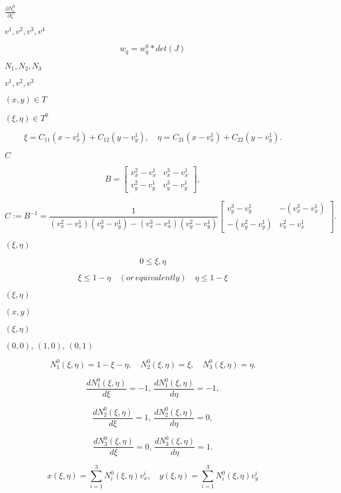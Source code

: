 \documentclass{article}
\begin{document}
$ \frac{\partial N^0_i} {\partial \zeta }
$
\pagebreak

$ v^1, v^2, v^3, v^4
$
\pagebreak

\[ w_q = w^0_q * det(J) \]
\pagebreak

$ N_1, N_2, N_3$
\pagebreak

$ v^1, v^2, v^3$
\pagebreak

$ (x,y) \in T $
\pagebreak

$ (\xi, \eta) \in T^0 $
\pagebreak

\[ \xi = C_{11} (x - v^1_x) + C_{12} (y - v^1_y), \quad \eta = C_{21} (x -
v^1_x) + C_{22} (y - v^1_y). \]
\pagebreak

$ C$
\pagebreak

\[ B = \left[ {\begin{array}{cc} v^2_x - v^1_x & v^3_x - v^1_x \\
v^2_y - v^1_y & v^3_y - v^1_y \end{array}}\right], \]
\pagebreak

\[ C := B^{-1} = \frac{1}{(v^2_x - v^1_x)(v^3_y - v^1_y) - (v^3_x - v^1_x)
(v^2_y - v^1_y)} \left[ {\begin{array}{cc} v^3_y - v^1_y & -(v^3_x -
v^1_x) \\ -(v^2_y - v^1_y) & v^2_x - v^1_x \end{array}}\right]. \]
\pagebreak

$ (\xi, \eta)$
\pagebreak

\[ 0\leq \xi, \eta \]
\pagebreak

\[ \xi \leq 1 - \eta \quad (or\, equivalently) \quad \eta \leq 1 -
\xi \]
\pagebreak

$ (\xi,\eta) $
\pagebreak

$(x,y) $
\pagebreak

$
(\xi, \eta)$
\pagebreak

$ (0,0), \, (1,0), \, (0,1) $
\pagebreak

\[N^0_1(\xi, \eta) = 1- \xi - \eta, \quad N^0_2(\xi, \eta) = \xi, \quad
N^0_3(\xi, \eta) = \eta. \]
\pagebreak

\[\frac{d N^0_1(\xi, \eta)}{d\xi} = -1, \, \frac{d N^0_1(\xi, \eta)
}{d\eta} = -1, \]
\pagebreak

\[\frac{d N^0_2(\xi, \eta)}{d\xi} = 1, \, \frac{d N^0_2(\xi, \eta)}{d\eta}
= 0, \]
\pagebreak

\[\frac{d N^0_3(\xi, \eta)}{d\xi} = 0, \, \frac{d N^0_3(\xi, \eta)}{d\eta}
= 1. \]
\pagebreak

\[ x(\xi, \eta) = \sum_{i=1}^3 N^0_i(\xi, \eta) v^i_x, \quad y(\xi, \eta)
= \sum_{i=1}^3 N^0_i(\xi, \eta) v^i_y \]
\pagebreak
\end{document}
